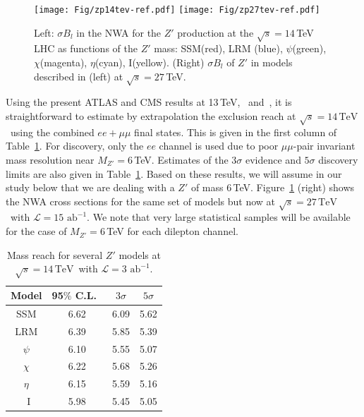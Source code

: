 \documentclass[a4paper,11pt]{article}
\newcommand*{\intlumihelhc}{\ensuremath{\mathcal{L}=15\,\text{ab}^{-1}}}
\newcommand*{\cl}{C.L.~}
\newcommand*{\sqrtslhc}{\ensuremath{\sqrt{s}=14\,\text{TeV}}}
\newcommand*{\sqrtshelhc}{\ensuremath{\sqrt{s}=27\,\text{TeV}}}
\renewcommand*{\intlumihelhc}{\ensuremath{\mathcal{L}=15\text{ ab}^{-1}}}
\newcommand*{\intlumihllhc}{\ensuremath{\mathcal{L}=3\text{ ab}^{-1}}}
\begin{document}
\begin{figure}[htbp]
  \centering
    \texttt{[image: Fig/zp14tev-ref.pdf]}
    \texttt{[image: Fig/zp27tev-ref.pdf]}
    \caption{Left: $\sigma B_l$ in the NWA for the $Z'$ production at the $\sqrt s=14$\,TeV LHC as functions of the $Z'$ mass: SSM(red), LRM (blue), $\psi$(green), $\chi$(magenta),
$\eta$(cyan), I(yellow). (Right) $\sigma B_l$ of $Z'$ in models described in (left) at $\sqrt s=27$\,TeV.}
\label{fig:pheno:toy}
\end{figure}

Using the present ATLAS and CMS results at 13\,TeV,~\cite{Aaboud:2017buh} and~\cite{Sirunyan:2018exx}, it is straightforward to estimate by extrapolation the
exclusion reach at \sqrtslhc\ using the combined $ee+\mu\mu$ final states. This is given in the first column of Table~\ref{tab:pheno:spec}. For discovery, only the $ee$ channel is used due to poor $\mu\mu$-pair invariant mass resolution near $M_{Z'}=6$\,TeV. Estimates of the $3\sigma$ evidence and $5\sigma$
discovery limits are also given in Table~\ref{tab:pheno:spec}. Based on these results, we will assume in our study below that we are dealing with a $Z'$ of mass 6\,TeV. Figure~\ref{fig:pheno:toy} (right) shows the NWA cross sections for the same set of models but now at \sqrtshelhc\ with \intlumihelhc. We note that very large statistical samples will be available for the case of $M_{Z'}=6$\,TeV
for each dilepton channel.

%
\begin{table}
\centering
\begin{tabular}{c|c|c|c}

  Model &   95$\%$ \cl  &  $3\sigma$  & $5\sigma$   \\
\hline
\hline
SSM    &     6.62     &  6.09    &  5.62     \\
LRM    &   6.39     & 5.85     & 5.39  \\
$\psi$    &  6.10   & 5.55   & 5.07  \\
$\chi$   &  6.22    & 5.68    & 5.26   \\
$\eta$   &  6.15     &  5.59  &  5.16   \\
~I        & 5.98   &  5.45   &  5.05  \\
\end{tabular}
\caption{ Mass reach for several $Z'$ models at \sqrtslhc\ with \intlumihllhc. }
\label{tab:pheno:spec}
\end{table}
%

\end{document}

